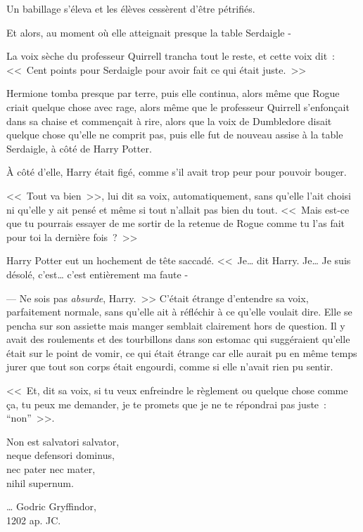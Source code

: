Un babillage s'éleva et les élèves cessèrent d'être pétrifiés.

Et alors, au moment où elle atteignait presque la table Serdaigle -

La voix sèche du professeur Quirrell trancha tout le reste, et cette voix dit~: <<~Cent points pour Serdaigle pour avoir fait ce qui était juste.~>>

Hermione tomba presque par terre, puis elle continua, alors même que Rogue criait quelque chose avec rage, alors même que le professeur Quirrell s'enfonçait dans sa chaise et commençait à rire, alors que la voix de Dumbledore disait quelque chose qu'elle ne comprit pas, puis elle fut de nouveau assise à la table Serdaigle, à côté de Harry Potter.

À côté d'elle, Harry était figé, comme s'il avait trop peur pour pouvoir bouger.

<<~Tout va bien~>>, lui dit sa voix, automatiquement, sans qu'elle l'ait choisi ni qu'elle y ait pensé et même si tout n'allait pas bien du tout. <<~Mais est-ce que tu pourrais essayer de me sortir de la retenue de Rogue comme tu l'as fait pour toi la dernière fois~?~>>

Harry Potter eut un hochement de tête saccadé. <<~Je… dit Harry. Je… Je suis désolé, c'est… c'est entièrement ma faute -

--- Ne sois pas \emph{absurde}, Harry.~>> C'était étrange d'entendre sa voix, parfaitement normale, sans qu'elle ait à réfléchir à ce qu'elle voulait dire. Elle se pencha sur son assiette mais manger semblait clairement hors de question. Il y avait des roulements et des tourbillons dans son estomac qui suggéraient qu'elle était sur le point de vomir, ce qui était étrange car elle aurait pu en même temps jurer que tout son corps était engourdi, comme si elle n'avait rien pu sentir.

<<~Et, dit sa voix, si tu veux enfreindre le règlement ou quelque chose comme ça, tu peux me demander, je te promets que je ne te répondrai pas juste~: “non”~>>.
\later

\begin{center}
Non est salvatori salvator,\\
neque defensori dominus,\\
nec pater nec mater,\\
nihil supernum.

… Godric Gryffindor,\\
1202 ap. JC.
\end{center}

